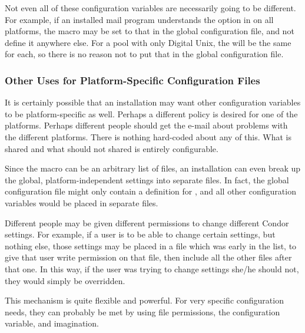 Not even all of these configuration variables are necessarily
going to be different.
For example, if an installed mail program understands the
 option in  on all platforms,
the  macro may be set to that in the global configuration
file, and not define it anywhere else.
For a pool with only Digital Unix,
the  will be the same for each, so there is no
reason not to put that in the global configuration file.

\subsubsection{\label{sec:Other-Uses-for-Platform-Files}Other Uses for
Platform-Specific Configuration Files} 

It is certainly possible that an installation may want other 
configuration variables to be platform-specific as well.
Perhaps a different policy is desired for
one of the platforms.
Perhaps different people should get the
e-mail about problems with the different platforms.
There is nothing hard-coded about any of this.
What is shared and
what should not shared is entirely configurable.

Since the  macro can be an arbitrary
list of files, an installation can even break up the global,
platform-independent settings into separate files.
In fact, the global configuration file might
only contain a definition for , and all
other configuration variables would be placed in separate files.  

Different people may be given different permissions to change different
Condor settings.  For example, if a user is to be able to
change certain settings, but nothing else, those
settings may be placed in a file which was early
in the  list,
to give that user write permission on that file, then include all
the other files after that one.  In this way, if the user was trying to
change settings she/he should not, they would simply be overridden.  

This mechanism is quite flexible and powerful.  For
very specific configuration needs, they can probably be met by
using file permissions, the  configuration
variable, and imagination.

